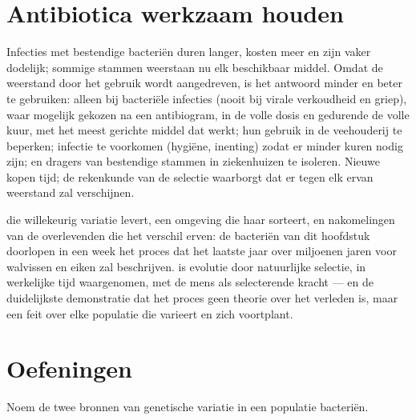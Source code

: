 \section{Antibiotica werkzaam houden}

\begin{proposition}\label{prop:g11:antibiotic-resistance:consequences}
Infecties met bestendige bacteriën duren langer, kosten meer en zijn
vaker dodelijk; sommige stammen weerstaan nu elk beschikbaar middel.
Omdat de weerstand door het gebruik wordt aangedreven, is het antwoord
 minder en beter te gebruiken: alleen bij bacteriële infecties
(nooit bij virale verkoudheid en griep), waar mogelijk gekozen na een
antibiogram, in de volle dosis en gedurende de volle kuur, met het meest
gerichte middel dat werkt; hun gebruik in de veehouderij te beperken;
infectie te voorkomen (hygiëne, inenting) zodat er minder kuren nodig
zijn; en dragers van bestendige stammen in ziekenhuizen te isoleren.
Nieuwe  kopen tijd; de rekenkunde van de selectie waarborgt
dat er tegen elk ervan weerstand zal verschijnen.
\end{proposition}
\admitted

\begin{remark}\label{rem:g11:antibiotic-resistance:evolution}
 die willekeurig variatie levert, een omgeving die haar sorteert,
en nakomelingen van de overlevenden die het verschil erven: de bacteriën
van dit hoofdstuk doorlopen in een week het proces dat het laatste jaar
over miljoenen jaren voor walvissen en eiken zal beschrijven.
 is evolutie door natuurlijke selectie, in
werkelijke tijd waargenomen, met de mens als selecterende kracht --- en de
duidelijkste demonstratie dat het proces geen theorie over het verleden
is, maar een feit over elke populatie die varieert en zich voortplant.
\end{remark}

\section{Oefeningen}

\begin{exercise}[$\star$]\label{exo:g11:antibiotic-resistance:1}
Noem de twee bronnen van genetische variatie in een populatie bacteriën.
\end{exercise}

